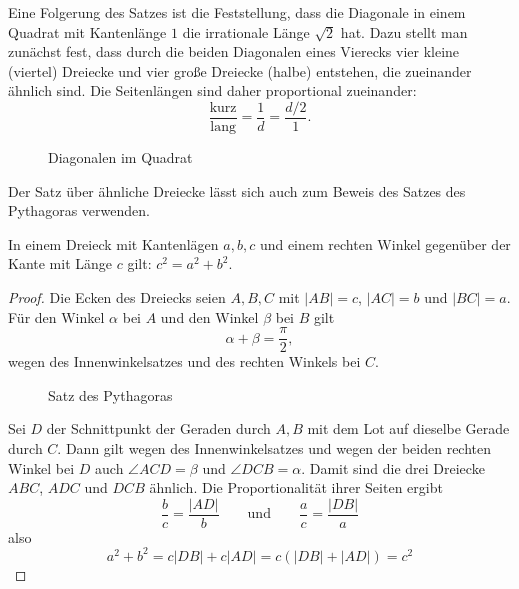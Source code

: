 Eine Folgerung des Satzes ist die Feststellung, dass die Diagonale in einem Quadrat mit Kantenlänge
$1$ die irrationale Länge $\sqrt{2}$ %
hat. Dazu stellt man zunächst fest, dass durch die beiden Diagonalen eines Vierecks vier kleine
(viertel) Dreiecke und vier große Dreiecke (halbe) entstehen, die zueinander ähnlich sind. Die
Seitenlängen sind daher proportional zueinander:
$$
    \frac{\mbox{kurz}}{\mbox{lang}} = \frac{1}{d} = \frac{d/2}{1}.
$$

\begin{figure}[h]
    
    \caption{Diagonalen im Quadrat}
\end{figure}

Der Satz über ähnliche Dreiecke lässt sich auch zum Beweis des Satzes des Pythagoras verwenden.


\begin{thm}
    In einem Dreieck mit Kantenlägen $a,b,c$ und einem rechten Winkel gegenüber der Kante mit Länge
    $c$ gilt: $c^2=a^2+b^2$.
\end{thm}

\begin{proof}
    Die Ecken des Dreiecks seien $A,B,C$ mit $|AB|=c$, $|AC|=b$ und $|BC|=a$. Für den Winkel
    $\alpha$ bei $A$ und den Winkel $\beta$ bei $B$ gilt
    $$
        \alpha + \beta = \frac{\pi}{2},
    $$
    wegen des Innenwinkelsatzes und des rechten Winkels bei $C$.

    \begin{figure}[h]
        
        \caption{Satz des Pythagoras}
    \end{figure}

    Sei $D$ der Schnittpunkt der Geraden durch $A,B$ mit dem Lot auf dieselbe Gerade durch $C$. Dann
    gilt wegen des Innenwinkelsatzes und wegen der beiden rechten Winkel bei $D$ auch $\angle ACD =
    \beta$ und $\angle DCB = \alpha$. Damit sind die drei Dreiecke $ABC$, $ADC$ und $DCB$ ähnlich.
    Die Proportionalität ihrer Seiten ergibt
    $$
        \frac{b}{c} = \frac{|AD|}{b} \qquad \mbox{und} \qquad \frac{a}{c} = \frac{|DB|}{a}
    $$
    also
    $$
        a^2+b^2 = c |DB| + c |AD| = c (|DB| + |AD|) = c^2
    $$
\end{proof}

